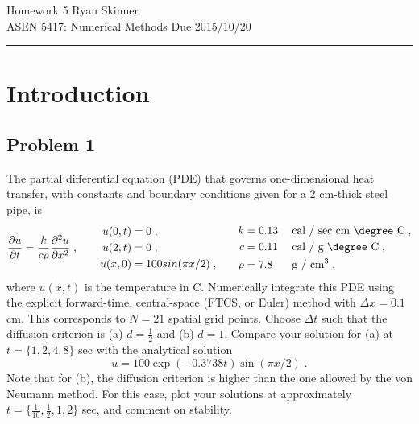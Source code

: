 \documentclass[11pt]{article}
\begin{document}
\pagestyle{fancyplain}
\lhead{}
\chead{}
\rhead{}
\cfoot{\hrule \thepage}

\noindent
{\Large Homework 5}
\hfill
{\large Ryan Skinner}
\\[0.5ex]
{\large ASEN 5417: Numerical Methods}
\hfill
{\large Due 2015/10/20}\\
\hrule
\vspace{6pt}

\section{Introduction} %

\subsection{Problem 1}

The partial differential equation (PDE) that governs one-dimensional heat transfer, with constants and boundary conditions given for a 2 cm-thick steel pipe, is
\begin{equation}
\frac{\partial u}{\partial t} = \frac{k}{c \rho} \frac{\partial^2 u}{\partial x^2}
\;,
\qquad
\begin{aligned}
u(0,t) &= 0 \;, \\
u(2,t) &= 0 \;, \\
u(x,0) &= 100 sin(\pi x / 2) \;,
\end{aligned}
\qquad
\begin{aligned}
k &= 0.13 \; &&\text{cal / sec cm \degree C} \;, \\
c &= 0.11 \; &&\text{cal / g \degree C} \;, \\
\rho &= 7.8 \; &&\text{g / cm$^3$}
\;,
\end{aligned}
\label{eq:prob1}
\end{equation}
where $u(x,t)$ is the temperature in \degree C. Numerically integrate this PDE using the explicit forward-time, central-space (FTCS, or Euler) method with $\Delta x = 0.1$ cm. This corresponds to $N = 21$ spatial grid points. Choose $\Delta t$ such that the diffusion criterion is (a) $d = \tfrac{1}{2}$ and (b) $d = 1$. Compare your solution for (a) at $t = \{1, 2, 4, 8\}$ sec with the analytical solution
\begin{equation}
u = 100 \exp(-0.3738t) \sin(\pi x / 2)
\;.
\label{eq:prob1_analytic}
\end{equation}
Note that for (b), the diffusion criterion is higher than the one allowed by the von Neumann method. For this case, plot your solutions at approximately $t = \{\tfrac{1}{10}, \tfrac{1}{2}, 1, 2\}$ sec, and comment on stability.
\end{document}
